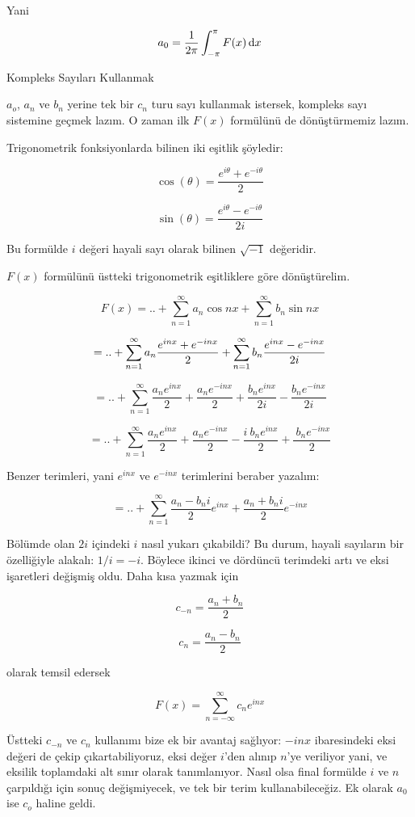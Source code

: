 \documentclass[12pt,fleqn]{article}\usepackage{../../common}
\begin{document}
Yani

$$ a_0 = \frac{1}{2\pi}\int_{-\pi}^{\pi}F(x) \,\mathrm{d} x $$

Kompleks Sayıları Kullanmak

$a_o$, $a_n$ ve $b_n$ yerine tek bir $c_n$ turu sayı kullanmak istersek,
kompleks sayı sistemine geçmek lazım. O zaman ilk $F(x)$ formülünü de
dönüştürmemiz lazım.

Trigonometrik fonksiyonlarda bilinen iki eşitlik şöyledir:

$$ \cos(\theta) = \frac{e^{i\theta}+e^{-i\theta}}{2} $$

$$ \sin(\theta) = \frac{e^{i\theta}-e^{-i\theta}}{2i}  $$

Bu formülde $i$ değeri hayali sayı olarak bilinen $\sqrt{-1}$ değeridir. 

$F(x)$ formülünü üstteki trigonometrik eşitliklere göre dönüştürelim. 

$$ F(x) = .. +  \sum_{n=1}^{\infty}a_n \cos nx + \sum_{n=1}^{\infty}b_n \sin nx $$

$$ = .. + \sum_{n=1}^{\infty} a_n \frac{e^{inx} + e^{-inx}}{2} +  \sum_{n=1}^{\infty} b_n \frac{e^{inx} - e^{-inx}}{2i}\\ $$

$$ = .. + \sum_{n=1}^{\infty} \frac{a_ne^{inx}}{2} + \frac{a_ne^{-inx}}{2} +
\frac{b_ne^{inx}}{2i} - \frac{b_ne^{-inx}}{2i} $$

$$ = .. + \sum_{n=1}^{\infty} \frac{a_ne^{inx}}{2} + \frac{a_ne^{-inx}}{2} -
\frac{i \ b_ne^{inx}}{2} + \frac{ \ b_ne^{-inx}}{2} $$

Benzer terimleri, yani $e^{inx}$ ve $e^{-inx}$ terimlerini beraber yazalım:

$$ = .. + \sum_{n=1}^{\infty} \frac{a_n-b_ni}{2}e^{inx} + \frac{a_n+b_ni}{2}e^{-inx} $$

Bölümde olan $2i$ içindeki $i$ nasıl yukarı çıkabildi? Bu durum, hayali
sayıların bir özelliğiyle alakalı: $1/i = -i$. Böylece ikinci ve dördüncü
terimdeki artı ve eksi işaretleri değişmiş oldu. Daha kısa yazmak için

$$ c_{-n} = \frac{a_n + b_n}{2} $$

$$ c_{n} = \frac{a_n - b_n}{2} $$

olarak temsil edersek

$$F(x) = \sum_{n=-\infty}^{\infty} c_ne^{inx} $$

Üstteki $c_{-n}$ ve $c_n$ kullanımı bize ek bir avantaj sağlıyor:
$-inx$ ibaresindeki eksi değeri de çekip çıkartabiliyoruz, eksi değer
$i$'den alınıp $n$'ye veriliyor yani, ve eksilik toplamdaki alt sınır
olarak tanımlanıyor. Nasıl olsa final formülde $i$ ve $n$ çarpıldığı
için sonuç değişmiyecek, ve tek bir terim kullanabileceğiz. Ek olarak
$a_0$ ise $c_o$ haline geldi.
\end{document}

